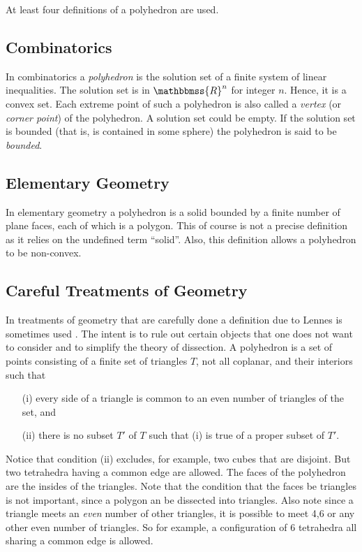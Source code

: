 \documentclass{article}
\newcommand{\mathbb}[1]{\mathbbmss{#1}}
\begin{document}
At least four  definitions of a polyhedron are used. 
\subsection*{Combinatorics}
In combinatorics a \emph{polyhedron} is the solution set of a finite system
of linear inequalities. The solution set is in ${\mathbb{R}}^n$ for integer
$n$. Hence, it is a convex set. Each extreme point of such a polyhedron is also called a \emph{vertex} (or \emph{corner point}) of the polyhedron. A solution 
set could be empty. If the solution set is bounded (that is, is contained in
some sphere) the polyhedron is said to be \emph{bounded}.


\subsection*{Elementary Geometry}

In elementary geometry a polyhedron is a  solid bounded by a finite number of plane faces, 
each of which is a polygon.  This of course is not a precise definition as it
relies on the undefined term ``solid''. Also, this definition allows a polyhedron
to be non-convex.

\subsection*{Careful Treatments of Geometry}
In treatments of geometry that are carefully done a definition due to Lennes is 
sometimes used \cite{LE}. The intent is to rule out certain objects that one does not want
to consider and to simplify the theory of dissection.
A polyhedron is a set of points consisting of a finite set of
triangles $T$, not all coplanar,   and their interiors such that
\begin{itemize}
\item[(i)] every side of a triangle is common to an even number of triangles of the
set, and
\item[(ii)] there is no subset $T'$ of $T$ such that (i) is true of a proper subset
of $T'$. 
\end{itemize}
Notice that condition (ii) excludes, for example, two cubes that are disjoint. But two
tetrahedra having a common edge are allowed. The faces of the polyhedron are the insides
of the triangles. Note that the condition that the faces be triangles 
is not important, since a polygon an be dissected into triangles. 
Also note since a triangle meets an \emph{even} number of other triangles,
it is possible to meet 4,6 or any other even number of triangles. So for example,
a configuration of 6 tetrahedra all sharing a common edge is allowed. 
\end{document}
